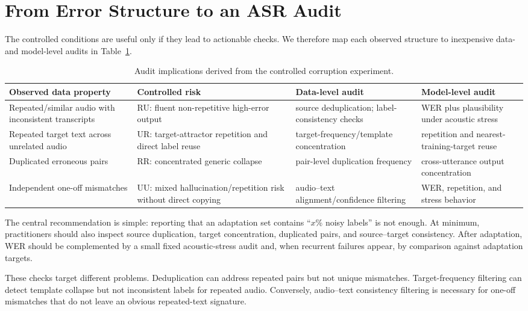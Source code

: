\documentclass[conference]{IEEEtran}
\begin{document}
\section{From Error Structure to an ASR Audit}
The controlled conditions are useful only if they lead to actionable checks. We
therefore map each observed structure to inexpensive data- and model-level
audits in Table~\ref{tab:audit}.

\begin{table}[t]
\centering
\caption{Audit implications derived from the controlled corruption experiment.}
\label{tab:audit}
\scriptsize
\setlength{\tabcolsep}{3.5pt}
\begin{tabular}{p{2.7cm}p{3.6cm}p{4.1cm}p{4.2cm}}
\toprule
Observed data property & Controlled risk & Data-level audit & Model-level audit \\
\midrule
Repeated/similar audio with inconsistent transcripts & RU: fluent non-repetitive high-error output & source deduplication; label-consistency checks & WER plus plausibility under acoustic stress \\
Repeated target text across unrelated audio & UR: target-attractor repetition and direct label reuse & target-frequency/template concentration & repetition and nearest-training-target reuse \\
Duplicated erroneous pairs & RR: concentrated generic collapse & pair-level duplication frequency & cross-utterance output concentration \\
Independent one-off mismatches & UU: mixed hallucination/repetition risk without direct copying & audio--text alignment/confidence filtering & WER, repetition, and stress behavior \\
\bottomrule
\end{tabular}
\end{table}

The central recommendation is simple: reporting that an adaptation set contains
``$x$\% noisy labels'' is not enough. At minimum, practitioners should also
inspect source duplication, target concentration, duplicated pairs, and
source--target consistency. After adaptation, WER should be complemented by a
small fixed acoustic-stress audit and, when recurrent failures appear, by
comparison against adaptation targets.

These checks target different problems. Deduplication can address repeated
pairs but not unique mismatches. Target-frequency filtering can detect template
collapse but not inconsistent labels for repeated audio. Conversely,
audio--text consistency filtering is necessary for one-off mismatches that do
not leave an obvious repeated-text signature.
\end{document}
